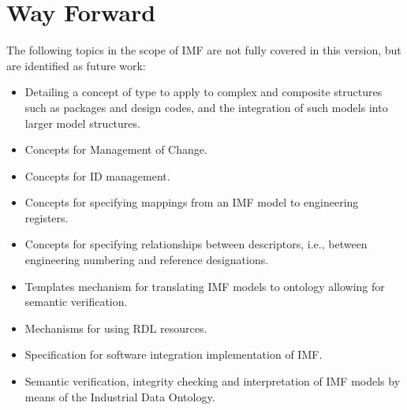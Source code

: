\documentclass[../main.tex]{subfiles}
\begin{document}
\chapter{Way Forward}
The following topics in the scope of IMF are not fully covered in this version, but are
identified as future work:

\begin{itemize}
  \item Detailing a concept of type to apply to complex and composite structures such as packages and design codes, and
        the integration of such models into larger model structures.
  \item Concepts for Management of Change.
  \item Concepts for ID management.
  \item Concepts for specifying mappings from an IMF model to engineering registers.
  \item Concepts for specifying relationships between descriptors, i.e., between engineering numbering and reference
        designations.
  \item Templates mechanism for translating IMF models to ontology allowing for semantic verification.
  \item Mechanisms for using RDL resources.
  \item Specification for software integration implementation of IMF.
  \item Semantic verification, integrity checking and interpretation of IMF models by means of the Industrial Data Ontology.
\end{itemize}
\end{document}
